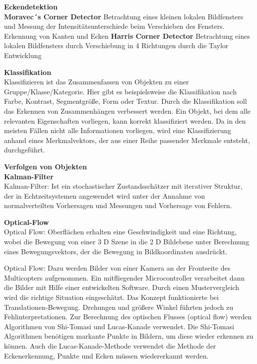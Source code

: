     \textbf{Eckendetektion}\\
    \textbf{Moravec´s Corner Detector} Betrachtung eines kleinen lokalen Bildfensters und Messung der Intensitätsunterschiede beim Verschieben des Fensters. Erkennung von Kanten und Ecken
    \textbf{Harris Corner Detector} Betrachtung eines lokalen Bildfensters durch Verschiebung in 4 Richtungen durch die Taylor Entwicklung


    \textbf{Klassifikation}\\ 
    Klassifizieren ist das Zusammenfassen von Objekten zu einer Gruppe/Klasse/Kategorie. Hier gibt es beispielsweise die Klassifikation nach Farbe, Kontrast, Segmentgröße, Form oder Textur. Durch die Klassifikation soll das Erkennen von Zusammenhängen verbessert werden. Ein Objekt, bei dem alle relevanten Eigenschaften vorliegen, kann korrekt klassifiziert werden. Da in den meisten Fällen nicht alle Informationen vorliegen, wird eine Klassifizierung anhand eines Merkmalvektors, der aus einer Reihe passender Merkmale entsteht, durchgeführt. \cite{Bildverarbeitung}
   
    \textbf{Verfolgen von Objekten}\\
    \textbf{Kalman-Filter}\\
    Kalman-Filter: Ist ein stochastischer Zustandsschätzer mit iterativer Struktur, der in Echtzeitsystemen angewendet wird unter der Annahme von normalverteilten Vorhersagen und Messungen und Vorhersage von Fehlern.


    \textbf{Optical-Flow}\\
    Optical Flow: Oberflächen erhalten eine Geschwindigkeit und eine Richtung, wobei die Bewegung von einer 3 D Szene in die 2 D Bildebene unter Berechnung eines Bewegungsvektors, der die Bewegung in Bildkoordinaten ausdrückt.

    Optical Flow: %
    Dazu werden Bilder von einer Kamera an der Frontseite des Multicopters aufgenommen. Ein mitfliegender Microcontroller verarbeitet dann die Bilder mit Hilfe einer entwickelten Software. Durch einen Mustervergleich wird die richtige Situation eingeschätzt. Das Konzept funktionierte bei Translationen-Bewegung. Drehungen und größere Winkel führten jedoch zu Fehlinterpretationen. Zur Berechnung des optischen Flusses (optical flow) werden Algorithmen von Shi-Tomasi und Lucas-Kanade verwendet. Die Shi-Tomasi Algorithmen benötigen markante Punkte in Bildern, um diese wieder erkennen zu können. Auch die Lucas-Kanade-Methode verwendet die Methode der Eckenerkennung, Punkte und Ecken müssen wiedererkannt werden.

